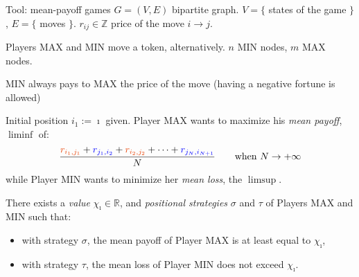 \documentclass[12pt]{beamer}
\newcommand{\bl}[1]{{\color{blue} #1}}
\newcommand{\R}{\mathbb{R}}
\begin{document}
\begin{frame}[plain]{Tool: mean-payoff games}
\normalsize
$G=(V,E)$ bipartite graph. $V=\{$ states of the game $\}$, $E = \{$ moves $\}$.
$r_{ij}\in \mathbb{Z}$ \bl{price} of the move $i \to j$.

\vfill 
\bl{Players MAX and MIN move a token, alternatively.}
%
%
$n$ MIN nodes, $m$ MAX nodes.

\vfill \bl{MIN always pays to MAX the price of
the move} (having a negative fortune is allowed)
%
%

\vfill 
%
\end{frame}\large
\normalsize
\begin{frame}[plain]
\begin{center}\small
{}
\end{center}
\vfill\pause
%
   \alert{Initial position $i_1:=\imath$} given. \bl{Player MAX wants to maximize
his \emph{mean payoff}}, $\liminf$ of:
   \begin{align*}
 \frac{\textcolor{redX}{r_{i_1, j_1}} + \bl{r_{j_1, i_2}} + \textcolor{redX}{r_{i_2, j_2}} + \dots + \bl{r_{j_N, i_{N+1}}}}{N} \qquad \text{when} \ N \rightarrow +\infty \label{eq:ratio}
 \end{align*}
  while \bl{Player MIN wants to minimize
 her \emph{mean loss}, the $\limsup$}. %
%
\vfill\pause
\begin{theorem}
\bl{There exists a \emph{value} $\chi_{\imath} \in \R$, and \emph{positional strategies}} $\sigma$ and $\tau$ of Players MAX and MIN such that:
\begin{itemize}
\item with strategy $\sigma$, the mean payoff of Player MAX is at least equal to $\chi_{\imath}$,
\item with strategy $\tau$, the mean loss of Player MIN does not exceed $\chi_{\imath}$.
\end{itemize}
\end{theorem}
\end{frame}
\end{document}
